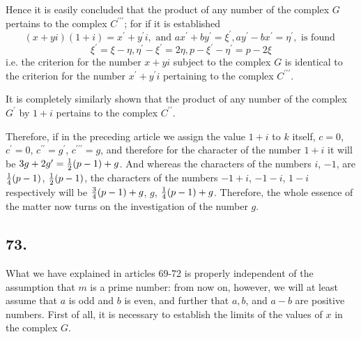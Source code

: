 \documentclass[twoside,12pt, showframe]{memoir}
\let\oldfrac\frac
\def\frac#1#2{\mathchoice{\tfrac{#1}{#2}}{\oldfrac{#1}{#2}}{\genfrac{}{}{}{2}{#1}{#2\mathstrut}}{\genfrac{}{}{}{3}{#1}{#2\mathstrut}}}
\begin{document}
Hence it is easily concluded that the product of any number of the complex \(G\) pertains to the complex \(C^{\prime\prime\prime}\); for if it is established
\[
(x+yi)(1+i) = x^{\prime}+y^{\prime}i, \text{ and } ax^{\prime}+by^{\prime}=\xi^{\prime}, ay^{\prime}-bx^{\prime}=\eta^{\prime}, \text{ is found }
\]
\[
\xi^{\prime} = \xi-\eta, \eta^{\prime}-\xi^{\prime}=2\eta, p-\xi^{\prime}-\eta^{\prime}=p-2\xi
\]
i.e. the criterion for the number \(x+yi\) subject to the complex \(G\) is identical to the criterion for the number \(x^{\prime}+y^{\prime}i\) pertaining to the complex \(C^{\prime\prime\prime}\).

It is completely similarly shown that the product of any number of the complex \(G^{\prime}\) by \(1+i\) pertains to the complex \(C^{\prime\prime}\).

Therefore, if in the preceding article we assign the value \(1+i\) to \(k\) itself, \(c=0\), \(c^{\prime}=0\), \(c^{\prime\prime}=g^{\prime}\), \(c^{\prime\prime\prime}=g\), and therefore for the character of the number \(1+i\) it will be \(3g+2g^{\prime} = \frac{1}{2}(p-1)+g\). And whereas the characters of the numbers \(i\), \(-1\), are \(\frac{1}{4}(p-1)\), \(\frac{1}{2}(p-1)\), the characters of the numbers \(-1+i\), \(-1-i\), \(1-i\) respectively will be \(\frac{3}{4}(p-1)+g\), \(g\), \(\frac{1}{4}(p-1)+g\). Therefore, the whole essence of the matter now turns on the investigation of the number \(g\).
%

\subsection*{73.}

What we have explained in articles 69-72 is properly independent of the assumption that \(m\) is a prime number: from now on, however, we will at least assume that \(a\) is odd and \(b\) is even, and further that \(a, b\), and \(a-b\) are positive numbers. First of all, it is necessary to establish the limits of the values of \(x\) in the complex \(G\).
\end{document}
